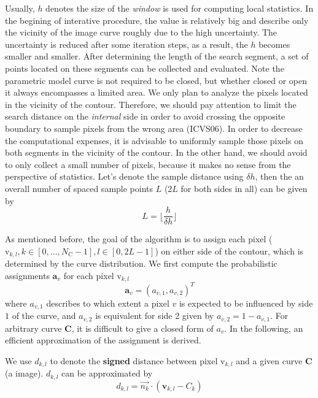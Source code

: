 Usually, $h$ denotes the size of the \textit{window} is used for computing
local statistics. In the begining of interative procedure, the value
is relatively big and describe only the vicinity of the image curve
roughly due to the high uncertainty. The
uncertainty is reduced after some iteration steps, as a result, the $h$ becomes smaller and
smaller. After determining the length of the search segment, 
a set of points located on these segments can be collected and
evaluated. Note the parametric model curve is not required to be
closed, but whether closed or open it always encompasses a limited area. We only plan to
analyze the pixels located in the vicinity of the contour. Therefore,
we should pay attention to limit the search distance on the
\textit{internal} side in order to avoid crossing the opposite
boundary to sample pixels from the wrong area (ICVS06). In order to
decrease the computational expenses, it is advisable to uniformly sample those
pixels on both segments in the vicinity of the contour. In the other
hand, we should avoid to only collect a small number of pixels, because
it makes no sense from the perspective of statistics. Let's denote the
sample distance using $\delta h$, then the an overall number of spaced
sample points $L$ ($2L$ for both sides in all) can be given by 
\begin{equation}
  \label{eq:5.5}
  L = \lfloor \frac{h}{\delta h} \rfloor
\end{equation}

As mentioned before, the goal of the algorithm is to assign each pixel
($\mathrm{v}_{k,l}, k \in [0,\ldots,N_{\mathrm{C}}-1], l \in [0,
2L-1]$) on either side of the contour, which is determined by the
curve distribution. We first compute the probabilistic
assignments $\mathbf{a}_{v}$ for each pixel $\mathrm{v}_{k,l}$
\begin{equation}
  \label{eq:5.6}
  \mathbf{a}_v  = (a_{v,1}, a_{v,2})^T
\end{equation}
where $a_{v,1}$ describes to which extent a pixel $v$ is expected to
be influenced by side $1$ of the curve, and $a_{v,2}$ is equivalent
for side 2 given by $a_{v,2} = 1- a_{v,1}$. For arbitrary curve
$\mathbf{C}$, it is difficult to give a closed form of $a_v$. In the
following, an efficient approximation of the assignment is derived.

We use $d_{k,l}$ to denote the \textbf{signed} distance between pixel
$\mathrm{v}_{k,l}$ and a given curve $\mathbf{C}$(a image). $d_{k,l}$
can be approximated by
\begin{equation}
  \label{eq:5.7}
  d_{k,l} = \vec{n_k} \cdot ( \mathbf{v}_{k,l} - C_k)
\end{equation}

